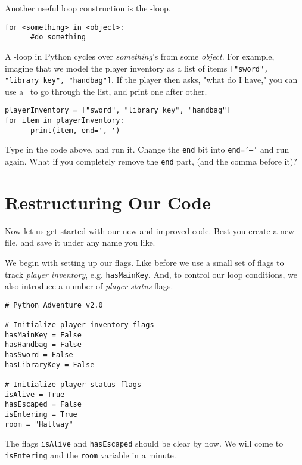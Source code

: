 Another useful loop construction is the \forloop-loop.  

\begin{lstlisting}
for <something> in <object>: 
      #do something  
\end{lstlisting}  

A \forloop-loop in Python cycles over \emph{something}'s from some \emph{object}. For example, imagine that we model the player inventory as a list of items \texttt{["sword", "library key", "handbag"]}. If the player then asks, "what do I have," you can use a \forloop\ to go through the list, and print one after other. 

\begin{lstlisting}
playerInventory = ["sword", "library key", "handbag"]
for item in playerInventory: 
      print(item, end=', ')
\end{lstlisting}  

\begin{Exe}
Type in the code above, and run it. Change the \texttt{end} bit into \texttt{end='--'} and run again. What if you completely remove the \texttt{end} part, (and the comma before it)? \expend  
\end{Exe}

\section{Restructuring Our Code} 

Now let us get started with our new-and-improved code. Best you create a new file, and save it under any name you like.

We begin with setting up our flags. Like before we use a small set of flags to track \emph{player inventory}, e.g. \texttt{hasMainKey}. And, to control our loop conditions, we also introduce a number of \emph{player status} flags.   

\begin{lstlisting}
# Python Adventure v2.0

# Initialize player inventory flags
hasMainKey = False
hasHandbag = False
hasSword = False
hasLibraryKey = False

# Initialize player status flags
isAlive = True
hasEscaped = False
isEntering = True
room = "Hallway"
\end{lstlisting}  

The flags \texttt{isAlive} and \texttt{hasEscaped} should be clear by now. We will come to \texttt{isEntering} and the \texttt{room} variable in a minute. 

